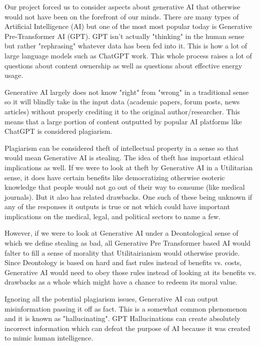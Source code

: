 \documentclass[letterpaper,11pt,leqno]{article}
\begin{document}
Our project forced us to consider aspects about generative AI that otherwise would not have been on the forefront of our minds. There are many types of Artificial Intelligence (AI) but one of the most most popular today is Generative Pre-Transformer AI (GPT). GPT isn't actually "thinking" in the human sense but rather "rephrasing" whatever data has been fed into it. This is how a lot of large language models such as ChatGPT work. This whole process raises a lot of questions about content ownership as well as questions about effective energy usage.

Generative AI largely does not know "right" from "wrong" in a traditional sense so it will blindly take in the input data (academic papers, forum posts, news articles) without properly crediting it to the original author/researcher. This means that a large portion of content outputted by popular AI platforms like ChatGPT is considered plagiarism.

Plagiarism can be considered theft of intellectual property in a sense so that would mean Generative AI is stealing. The idea of theft has important ethical implications as well. If we were to look at theft by Generative AI in a Utilitarian sense, it does have certain benefits like democratizing otherwise esoteric knowledge that people would not go out of their way to consume (like medical journals). But it also has related drawbacks. One such of these being unknown if any of the responses it outputs is true or not which could have important implications on the medical, legal, and political sectors to name a few.

However, if we were to look at Generative AI under a Deontological sense of which we define stealing as bad, all Generative Pre Transformer based AI would falter to fill a sense of morality that Utilitairianism would otherwise provide. Since Deontology is based on hard and fast rules instead of benefits vs. costs, Generative AI would need to obey those rules instead of looking at its benefits vs. drawbacks as a whole which might have a chance to redeem its moral value.

Ignoring all the potential plagiarism issues, Generative AI can output misinformation passing it off as fact. This is a somewhat common phenomenon and it is known as "hallucinating". GPT Hallucinations can create absolutely incorrect information which can defeat the purpose of AI because it was created to mimic human intelligence.
\end{document}
